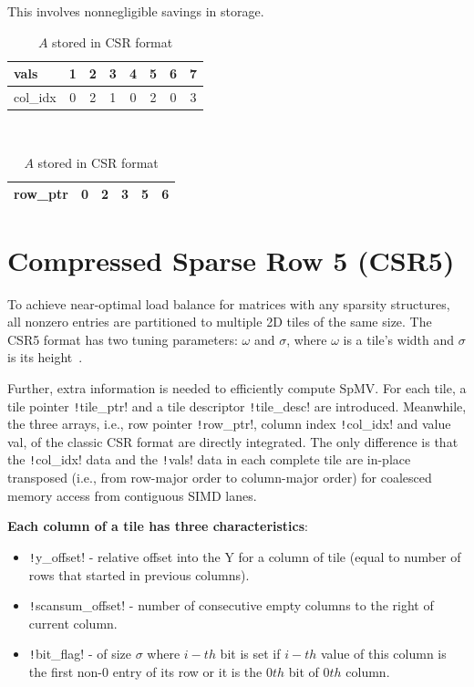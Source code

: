 \documentclass[thesis=M,english]{FITthesis}[2019/12/23]
\newcommand{\csre}[1]{\texttt!#1!}
\begin{document}
This involves nonnegligible savings in storage.

\begin{table}[h!]
    \centering
    \begin{tabular}{ |l||c|c|c|c|c|c|c| }
        \hline
        vals     & 1 & 2 & 3 & 4 & 5 & 6 & 7 \\
        \hline
        col\_idx & 0 & 2 & 1 & 0 & 2 & 0 & 3 \\
        \hline
    \end{tabular} \\
    \begin{tabular}{ |l||c|c|c|c|c| }
        \hline
        row\_ptr & 0 & 2 & 3 & 5 & 6 \\
        \hline
    \end{tabular}
    \caption{$A$ stored in CSR format}
\end{table}

\section{Compressed Sparse Row 5 (CSR5)}\label{csr5Intro}

To achieve near-optimal load balance for matrices with any sparsity structures,
all nonzero entries are partitioned to multiple 2D tiles of the same size.
The CSR5 format has two tuning parameters: \(\omega{}\) and \(\sigma{}\), where \(\omega{}\)
is a tile’s width and \(\sigma{}\) is its height~\cite{liu2015csr5}.

Further, extra information is needed to efficiently compute SpMV\@.
For each tile, a tile pointer \csre{tile_ptr} and a tile descriptor \csre{tile_desc} are introduced.
Meanwhile, the three arrays, i.e., row pointer \csre{row_ptr}, column index \csre{col_idx} and value val,
of the classic CSR format are directly integrated. The only difference is that the \csre{col_idx} data and the \csre{vals}
data in each complete tile are in-place transposed (i.e., from row-major order to column-major order) for coalesced memory access from contiguous SIMD lanes.


\textbf{Each column of a tile has three characteristics}:
\begin{itemize}
    \item \csre{y_offset} - relative offset into the Y for a column of tile (equal to number of rows that started in previous columns).
    \item \csre{scansum_offset} - number of consecutive empty columns to the right of current column.
    \item \csre{bit_flag} - of size $\sigma$ where $i-th$ bit is set if $i-th$ value of this column is the first non-0 entry of its row
          or it is the $0th$ bit of $0th$ column.
\end{itemize}
\end{document}
